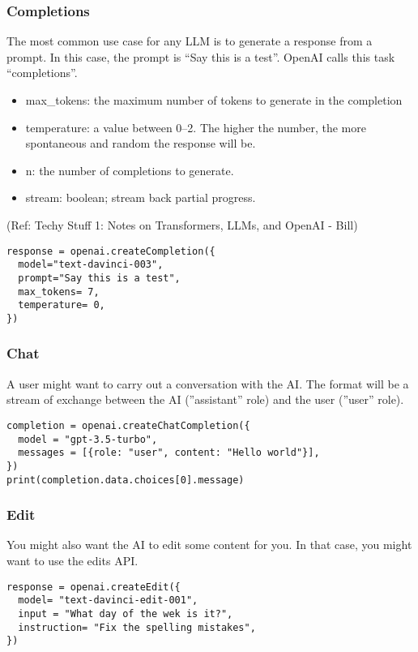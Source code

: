\begin{frame}[fragile]\frametitle{Completions}

The most common use case for any LLM is to generate a response from a prompt. In this case, the prompt is “Say this is a test”. OpenAI calls this task “completions”.

\begin{itemize}
\item max\_tokens: the maximum number of tokens to generate in the completion
\item temperature: a value between 0–2. The higher the number, the more spontaneous and random the response will be.
\item n: the number of completions to generate.
\item stream: boolean; stream back partial progress.	
\end{itemize}	 

{\tiny (Ref: Techy Stuff 1: Notes on Transformers, LLMs, and OpenAI - Bill)}

\begin{lstlisting}
response = openai.createCompletion({
  model="text-davinci-003",
  prompt="Say this is a test",
  max_tokens= 7,
  temperature= 0,
})
\end{lstlisting}	


			
\end{frame}

\begin{frame}[fragile]\frametitle{Chat}

A user might want to carry out a conversation with the AI. The format will be a stream of exchange between the AI (''assistant'' role) and the user (''user'' role).

\begin{lstlisting}
completion = openai.createChatCompletion({
  model = "gpt-3.5-turbo",
  messages = [{role: "user", content: "Hello world"}],
})
print(completion.data.choices[0].message)
\end{lstlisting}		

			
\end{frame}

\begin{frame}[fragile]\frametitle{Edit}

You might also want the AI to edit some content for you. In that case, you might want to use the edits API.

\begin{lstlisting}
response = openai.createEdit({
  model= "text-davinci-edit-001",
  input = "What day of the wek is it?",
  instruction= "Fix the spelling mistakes",
})
\end{lstlisting}		

			
\end{frame}

